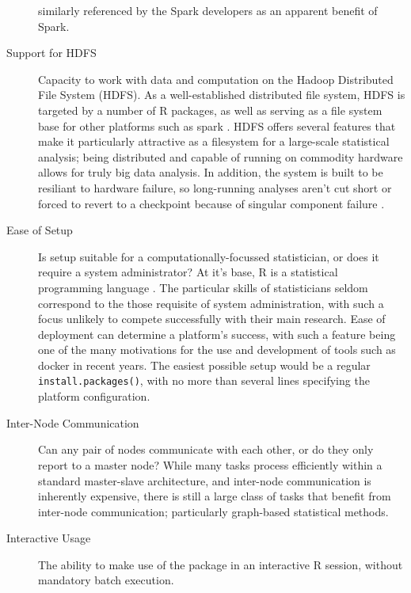 \documentclass[a4paper,10pt]{article}
\begin{document}
\begin{description}
      similarly referenced by the Spark developers as an
      apparent benefit of Spark\cite{zaharia2010spark}.
\item[Support for HDFS]
      Capacity to work with data and computation on the Hadoop
      Distributed File System (HDFS).
      As a well-established distributed file system, HDFS is targeted
      by a number of R packages, as well as serving as a file
      system base for other platforms such as spark
      \cite{analytics:_rhadoop_wiki} \cite{deltarho:_rhipe}
      \cite{urbanek20} \cite{zaharia2016apache}.
      HDFS offers several features that make it particularly
      attractive as a filesystem for a large-scale statistical
      analysis;
      being distributed and capable of running on commodity hardware
      allows for truly big data analysis.
      In addition, the system is built to be resiliant to hardware
      failure, so long-running analyses aren't cut short or forced to
      revert to a checkpoint because of singular component failure
      \cite{shvachko2010hadoop}.
\item[Ease of Setup]
      Is setup suitable for a computationally-focussed
      statistician, or does it require a system administrator?
      At it's base, R is a statistical programming language
      \cite{rcore2020intro}.
      The particular skills of statisticians seldom correspond to the
      those requisite of system administration, with such a focus
      unlikely to compete successfully with their main research.
      Ease of deployment can determine a platform's success, with
      such a feature being one of the many motivations for the use
      and development of tools such as docker in recent years.
      The easiest possible setup would be a regular
      \texttt{install.packages()}, with no more than several lines
      specifying the platform configuration.
\item[Inter-Node Communication]
      Can any pair of nodes communicate with each other, or do they
      only report to a master node?
      While many tasks process efficiently within a standard
      master-slave architecture, and inter-node communication is
      inherently expensive, there is still a large class of tasks
      that benefit from inter-node communication\cite{walker1996mpi};
      particularly graph-based statistical methods.
\item[Interactive Usage]
      The ability to make use of the package in an interactive R
      session, without mandatory batch execution.

\end{description}
\end{document}
